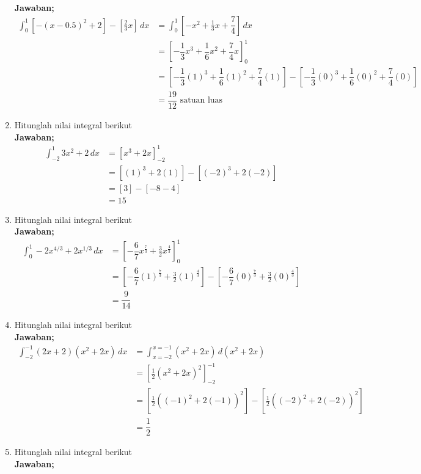 \begin{enumerate}
	\textbf{Jawaban;}
	\begin{align*}
		\int_{0}^{1}\left[ -(x-0.5)^2+2 \right] - \left[ \frac{2}{3}x\right] \,dx &=\int_{0}^{1}\left[ -x^2 + \frac{1}{3}x+\dfrac{7}{4} \right] \,dx\\
		&= \left[-\dfrac{1}{3}x^3 + \dfrac{1}{6}x^2 +\dfrac{7}{4}x \right]_{0}^{1} \\
		&= \left[-\dfrac{1}{3}(1)^3 + \dfrac{1}{6}(1)^2 +\dfrac{7}{4}(1) \right]- \left[-\dfrac{1}{3}(0)^3 + \dfrac{1}{6}(0)^2 +\dfrac{7}{4}(0) \right] \\
		&= \dfrac{19}{12} \text{ satuan luas}
	\end{align*} 
	\item Hitunglah nilai integral berikut\\ %
	\textbf{Jawaban;}
	\begin{align*}
		\int_{-2}^{1}3x^2+2 \,dx &= \left[x^3+2x \right]_{-2}^{1} \\
		&= [(1)^3+2(1)]-[(-2)^3+2(-2)] \\
		&= [3]-[-8-4]\\
		&= 15
	\end{align*} 
	\item Hitunglah nilai integral berikut \\ %
	\textbf{Jawaban;}
	\begin{align*}
		\int_{0}^{1}-2x^{4/3} + 2x^{1/3} \,dx &= \left[-\dfrac{6}{7}x^{\frac{7}{3}}+\frac{3}{2}x^{\frac{4}{3}} \right]_{0}^{1} \\
		&= \left[-\dfrac{6}{7}(1)^{\frac{7}{3}}+\frac{3}{2}(1)^{\frac{4}{3}} \right]
		-\left[-\dfrac{6}{7}(0)^{\frac{7}{3}}+\frac{3}{2}(0)^{\frac{4}{3}} \right] \\
		&= \dfrac{9}{14}
	\end{align*} 
	\item Hitunglah nilai integral berikut\\ %
	\textbf{Jawaban;}
	\begin{align*}
		\int_{-2}^{-1}(2x+2)(x^2+2x) \,dx  &= \int_{x=-2}^{x=-1}(x^2+2x) \,d(x^2+2x) \\
		&= \left[ \frac{1}{2}(x^2+2x)^2 \right]_{-2}^{-1} \\
		&= \left[\frac{1}{2}((-1)^2+2(-1))^2\right]-\left[\frac{1}{2}((-2)^2+2(-2))^2\right] \\
		&= \dfrac{1}{2}
	\end{align*} 
	\item Hitunglah nilai integral berikut\\ %
	\textbf{Jawaban;}
	\begin{align*}

\end{align*}
\end{enumerate}
